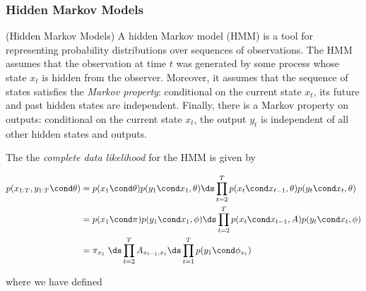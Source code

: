 \documentclass{article} %
\newcommand{\param}{\theta}
\newcommand{\state}{x}
\begin{document}
\subsubsection{Hidden Markov Models} 

\begin{example}{(Hidden Markov Models)} 
A  hidden Markov model (HMM) is a tool for representing probability distributions over sequences of observations.  The HMM assumes that the observation at time $t$ was generated by some process whose state $\state_t$ is hidden from the observer.  Moreover, it assumes that the sequence of states satisfies the \textit{Markov property}:  conditional on the current state $\state_t$, its future and past hidden states are independent.  Finally, there is a Markov property on outputs:  conditional on the current state $\state_t$, the output $y_t$ is independent of all other hidden states and outputs.

%
%
 
The the \textit{complete data likelihood} for the HMM is given by

\begin{align}
 p(\state_{1:T}, y_{1:T} \cond \param) &=  p(\state_1 \cond \param)  p(y_1 \cond \state_1, \param) \ds\prod_{t=2}^T p(\state_t \cond \state_{t-1}, \param) p(y_t \cond \state_t, \param) \nonumber \\
 &=  p(\state_1 \cond \pi) p(y_1 \cond \state_1, \phi) \ds\prod_{t=2}^T p(\state_t \cond \state_{t-1}, A) p(y_t \cond \state_t, \phi)   \nonumber \\
 &= \pi_{\state_1}  \; \ds\prod_{t=2}^T A_{\state_{t-1}, \state_t} \ds\prod_{t=1}^T p(y_1 \cond \phi_{\state_t}) \label{eqn:hmm_cdl_compact}
 \end{align}
 
where we have defined 


\end{example}
\end{document}
